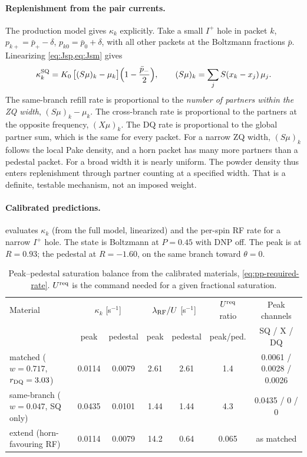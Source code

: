 \documentclass[11pt]{article}
\newcommand{\Iplus}{I^{+}}
\begin{document}
\paragraph{Replenishment from the pair currents.}
The production model gives \(\kappa_k\) explicitly. Take a small \(\Iplus\) hole in packet \(k\),
\(p_{k+}=\bar p_+-\delta\), \(p_{k0}=\bar p_0+\delta\), with all other packets at the Boltzmann
fractions \(\bar p\). Linearizing \cref{eq:Jsp,eq:Jsm} gives
\begin{equation}
  \kappa^{\rm SQ}_k = K_0\,\bigl[(S\mu)_k-\mu_k\bigr]\Bigl(1-\frac{\bar p_-}{2}\Bigr),
  \qquad (S\mu)_k=\sum_jS(x_k-x_j)\,\mu_j .
  \label{eq:kappaSQ}
\end{equation}
The same-branch refill rate is proportional to the \emph{number of partners within the ZQ width},
\((S\mu)_k-\mu_k\). The cross-branch rate is proportional to the partners at the opposite
frequency, \((X\mu)_k\). The DQ rate is proportional to the global partner sum, which is the same
for every packet. For a narrow ZQ width, \((S\mu)_k\) follows the local Pake density, and a horn
packet has many more partners than a pedestal packet. For a broad width it is nearly uniform. The
powder density thus enters replenishment through partner counting at a specified width. That is
a definite, testable mechanism, not an imposed weight.

\paragraph{Calibrated predictions.}  evaluates \(\kappa_k\) (from the full
model, linearized) and the per-spin RF rate for a narrow \(\Iplus\) hole. The state is Boltzmann
at \(P=0.45\) with DNP off. The peak is at \(R=0.93\); the pedestal at \(R=-1.60\), on the same
branch toward \(\theta=0\).

\begin{table}[h]
\centering\footnotesize\setlength{\tabcolsep}{4pt}
\begin{tabular}{lcccccc}
\toprule
Material & \multicolumn{2}{c}{\(\kappa_k\) [s\(^{-1}\)]} & \multicolumn{2}{c}{\(\lambda_{\rm RF}/U\) [s\(^{-1}\)]} & \(U^{\rm req}\) ratio & Peak channels\\
 & peak & pedestal & peak & pedestal & peak/ped. & SQ / X / DQ\\
\midrule
matched (\(w=0.717\), \(r_{\rm DQ}=3.03\)) & 0.0114 & 0.0079 & 2.61 & 2.61 & 1.4 & 0.0061 / 0.0028 / 0.0026\\
same-branch (\(w=0.047\), SQ only) & 0.0435 & 0.0101 & 1.44 & 1.44 & 4.3 & 0.0435 / 0 / 0\\
extend (horn-favouring RF) & 0.0114 & 0.0079 & 14.2 & 0.64 & 0.065 & as matched\\
\bottomrule
\end{tabular}
\caption{Peak--pedestal saturation balance from the calibrated materials, \cref{eq:pp-required-rate}.
\(U^{\rm req}\) is the command needed for a given fractional saturation.}
\label{tab:peak-pedestal}
\end{table}
\end{document}

